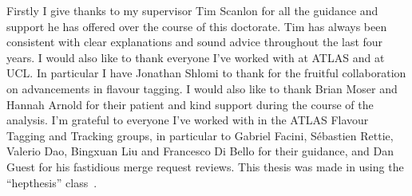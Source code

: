 Firstly I give thanks to my supervisor Tim Scanlon for all the guidance and support he has offered over the course of this doctorate.
Tim has always been consistent with clear explanations and sound advice throughout the last four years.
I would also like to thank everyone I've worked with at ATLAS and at UCL.
In particular I have Jonathan Shlomi to thank for the fruitful collaboration on advancements in flavour tagging.
I would also like to thank Brian Moser and Hannah Arnold for their patient and kind support during the course of the \VHbb analysis.
I'm grateful to everyone I've worked with in the ATLAS Flavour Tagging and Tracking groups, in particular to Gabriel Facini, S\'ebastien Rettie, Valerio Dao, Bingxuan Liu and Francesco Di Bello for their guidance, and Dan Guest for his fastidious merge request reviews.
This thesis was made in \LaTeXe{} using the ``hepthesis'' class~\cite{Buckley:2010:hepthesis}.

